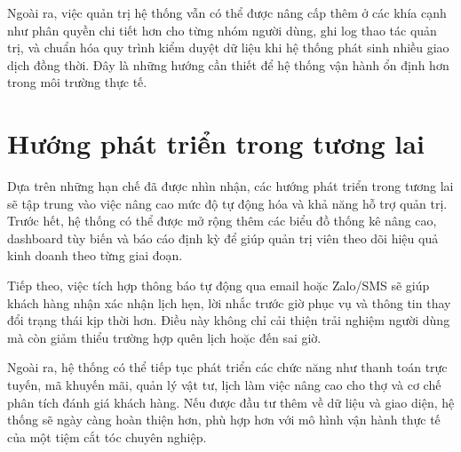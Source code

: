 Ngoài ra, việc quản trị hệ thống vẫn có thể được nâng cấp thêm ở các
khía cạnh như phân quyền chi tiết hơn cho từng nhóm người dùng, ghi log
thao tác quản trị, và chuẩn hóa quy trình kiểm duyệt dữ liệu khi hệ
thống phát sinh nhiều giao dịch đồng thời. Đây là những hướng cần thiết
để hệ thống vận hành ổn định hơn trong môi trường thực tế.

\section{Hướng phát triển trong tương lai}

Dựa trên những hạn chế đã được nhìn nhận, các hướng phát triển trong
tương lai sẽ tập trung vào việc nâng cao mức độ tự động hóa và khả năng
hỗ trợ quản trị. Trước hết, hệ thống có thể được mở rộng thêm các biểu
đồ thống kê nâng cao, dashboard tùy biến và báo cáo định kỳ để giúp
quản trị viên theo dõi hiệu quả kinh doanh theo từng giai đoạn.

Tiếp theo, việc tích hợp thông báo tự động qua email hoặc Zalo/SMS sẽ
giúp khách hàng nhận xác nhận lịch hẹn, lời nhắc trước giờ phục vụ và
thông tin thay đổi trạng thái kịp thời hơn. Điều này không chỉ cải thiện
trải nghiệm người dùng mà còn giảm thiểu trường hợp quên lịch hoặc đến
sai giờ.

Ngoài ra, hệ thống có thể tiếp tục phát triển các chức năng như thanh
toán trực tuyến, mã khuyến mãi, quản lý vật tư, lịch làm việc nâng cao
cho thợ và cơ chế phân tích đánh giá khách hàng. Nếu được đầu tư thêm
về dữ liệu và giao diện, hệ thống sẽ ngày càng hoàn thiện hơn, phù hợp
hơn với mô hình vận hành thực tế của một tiệm cắt tóc chuyên nghiệp.

